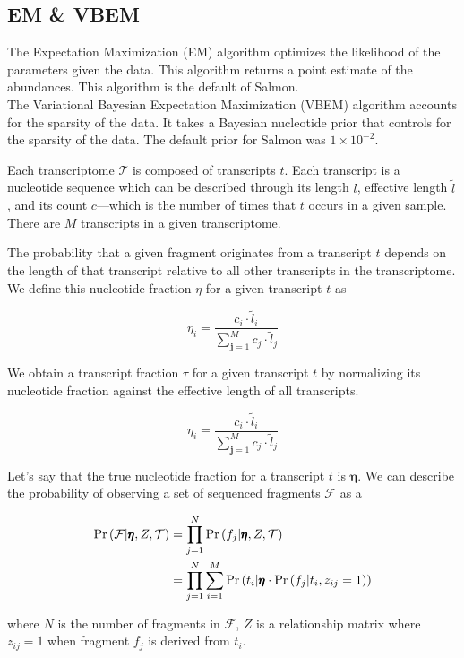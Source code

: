 \subsection{EM \& VBEM}

The Expectation Maximization (EM) algorithm optimizes the likelihood of the parameters given the data. This algorithm returns a point estimate of the abundances. 
This algorithm is  the default of Salmon.
\\
The Variational Bayesian Expectation Maximization (VBEM) algorithm accounts for the sparsity of the data. It takes a Bayesian nucleotide prior that controls for the sparsity of the data. The default prior for Salmon was $1 \times 10 ^{-2}$.

Each transcriptome \(\mathcal{T}\) is composed of transcripts \(t\).
Each transcript is a nucleotide sequence which can be described through
its length \(l\), effective length \(\tilde l\), and its count
\(c\)---which is the number of times that \(t\) occurs in a given
sample. There are \(M\) transcripts in a given transcriptome.

The probability that a given fragment originates from a transcript \(t\)
depends on the length of that transcript relative to all other
transcripts in the transcriptome. We define this nucleotide fraction
\(\eta\) for a given transcript \(t\) as

\[\eta_i= \dfrac{c_i \cdot \tilde l _i}{\sum^{M}_{\pmb{j} = 1}c_j \cdot \tilde l _j}\]

We obtain a transcript fraction \(\tau\) for a given transcript \(t\) by
normalizing its nucleotide fraction against the effective length of all
transcripts.

\[\eta_i= \dfrac{c_i \cdot \tilde l _i}{\sum^{M}_{\pmb{j} = 1}c_j \cdot \tilde l _j}\]

Let's say that the true nucleotide fraction for a transcript \(t\) is
\(\pmb{\eta}\). We can describe the probability of observing a set of
sequenced fragments \(\mathcal{F}\) as a

\[
$$	
\begin{align*}
	\Pr\left( \mathcal{F}| \pmb{\eta}, Z, \mathcal{T} \right) &= \prod^{N}_{j=1} \Pr\left( f_j| \pmb{\eta}, Z, \mathcal{T} \right)\\
	&= \prod^{N}_{j=1}\sum^{M}_{i=1} \Pr\left( t_i| \pmb{\eta} \cdot \Pr\left( f_j|t_i,z _{ij} =1 \right)  \right)
\end{align*}
$$
\]

where \(N\) is the number of fragments in \(\mathcal{F}\), \(Z\) is a
relationship matrix where \(z _{ij} =1\) when fragment \(f_j\) is
derived from \(t_i\).

